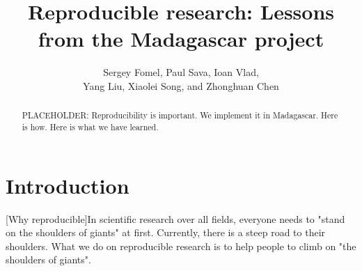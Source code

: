 \title{Reproducible research: Lessons from the Madagascar project}


\author{
Sergey Fomel\footnotemark[1],
Paul Sava\footnotemark[2],
Ioan Vlad\footnotemark[3], \\
Yang Liu\footnotemark[4],
Xiaolei Song\footnotemark[1], and
Zhonghuan Chen\footnotemark[5]
}

\address{
\footnotemark[1]Bureau of Economic Geology \\
Jackson School of Geosciences \\
The University of Texas at Austin \\
University Station, Box X \\
Austin, TX 78713-8972 \\
USA \\
\footnotemark[2] Department of Geophysics \\
Colorado School of Mines \\
Golden, CO 80401 \\
USA \\
\footnotemark[3] TGS \\
2500 CityWest Boulevard, Suite 2000 \\
Houston, Texas 77042
USA \\
\footnotemark[4] College of Geo-Exploration Science and Technology \\
Jilin University \\
No.938 Xi Minzhu Street \\
Changchun, Jilin Province 130026
China \\
\footnotemark[5] Department of Automation \\
Tsinghua University \\
FIT 1-115, Tsinghua University \\
Beijing 100084
China
}

\begin{abstract}
PLACEHOLDER: Reproducibility is important. We implement it in Madagascar. Here is how. Here is what we have learned.
\end{abstract}

\section{Introduction}

[Why reproducible]In scientific research over all fields,
everyone needs to "stand on the shoulders of giants" at first.
Currently, there is a steep road to their shoulders.
What we do on reproducible research 
is to help people to climb on "the shoulders of giants".

